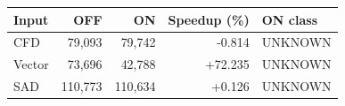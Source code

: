 \begin{tabular}{lrrrl}
\hline
Input & OFF & ON & Speedup (\%) & ON class \\
\hline
CFD & 79,093 & 79,742 & -0.814 & UNKNOWN \\
Vector & 73,696 & 42,788 & +72.235 & UNKNOWN \\
SAD & 110,773 & 110,634 & +0.126 & UNKNOWN \\
\hline
\end{tabular}

